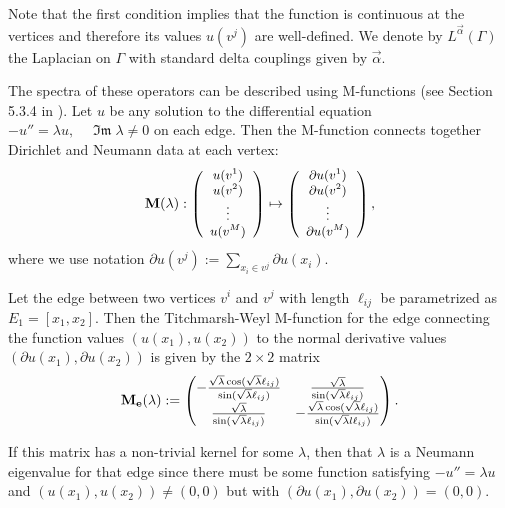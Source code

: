 \documentclass{amsart}
\theoremstyle{definition}
\theoremstyle{remark}
\numberwithin{equation}{section}
\newcommand{\de}{\partial}
\DeclareMathOperator{\im}{\mathfrak{Im}}
\begin{document}
Note that the first condition implies that the function is continuous at the vertices and therefore
its values $ u (v^j) $ are well-defined. We denote by $L^{\vec \alpha}(\Gamma)$ the Laplacian on $\Gamma$ with standard delta couplings given by $\vec \alpha$.


The spectra of these operators can be described using M-functions (see Section 5.3.4 in \cite{PK24}). 
Let $ u $ be any solution to the differential equation
$ -u''=\lambda  u, \quad \im \lambda \neq 0 $
on each edge. Then the M-function connects together Dirichlet and Neumann data at each vertex:
\begin{equation}  \label{eqM}
 \small \mathbf M (\lambda):
\left(
\begin{array}{c}
u (v^1)  \\
u (v^2)  \\
\vdots \\
u (v^M) 
\end{array}
\right)  \mapsto \left(
\begin{array}{c}
\partial u (v^1) \\
\partial u (v^2)  \\
\vdots \\
\partial u (v^M) \end{array}
\right) ,
\end{equation}
where we use notation
$ \partial u (v^j) := \sum_{x_i \in v^j} \partial u (x_i). $


Let the edge between two vertices $ v^i$ and $ v^j $ with length $ \ell_{ij}$ be parametrized as $ E_1 = [x_1, x_2] $. Then
the Titchmarsh-Weyl M-function for the edge connecting the function values $ (u(x_1), u(x_2)) $ to the normal derivative values $ (\partial u(x_1), \partial u(x_2) ) $
is given by the $ 2 \times 2 $ matrix
\begin{equation} \label{7}
 \mathbf M_{\bf e} (\lambda) : = \begin{pmatrix} -\frac{\sqrt{\lambda }\cos(\sqrt{\lambda }\ell_{ij})}{\sin(\sqrt{\lambda }\ell_{ij}) } & \frac{\sqrt{\lambda }}{\sin(\sqrt{\lambda }\ell_{ij} )}
 \\ \frac{\sqrt{\lambda }}{\sin(\sqrt{\lambda }\ell_{ij} )} & -\frac{\sqrt{\lambda }\cos(\sqrt{\lambda }\ell_{ij} )}{\sin(\sqrt{\lambda }l\ell_{ij} )}\end{pmatrix}.
 \end{equation}

If this matrix has a non-trivial kernel for some $\lambda $,
 then that $\lambda $ is a Neumann eigenvalue for that edge since there must be some function satisfying $-u''=\lambda  u$ and $(u(x_1),u(x_2))\neq (0,0)$ but with $(\de u(x_1),\de u(x_2))= (0,0)$.
\end{document}
